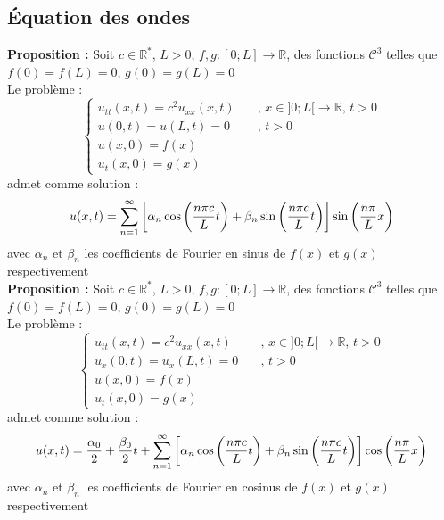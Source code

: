 \subsection{Équation des ondes}
\textbf{Proposition :} Soit $c \in \mathbb{R}^*$, $L > 0$, $f,g : [0;L] \to \mathbb{R}$, des fonctions $\mathcal{C}^3$ telles que $f(0) = f(L) = 0$, $g(0) = g(L) = 0$\\
Le problème :
$$
\begin{cases}
    u_{tt}(x,t) = c^2u_{xx}(x,t) \quad &\text{, } x \in ]0;L[ \to \mathbb{R} \text{, } t > 0 \\
    u(0,t) = u(L,t) = 0 \quad &\text{, } t > 0 \\
    u(x,0) = f(x) \\
    u_t(x,0) = g(x)
\end{cases}
$$
admet comme solution :
$$u(x,t) = \sum_{n=1}^{\infty} \bigg{[} \alpha_n \cos \bigg{(} \frac{n\pi c}{L}t \bigg{)} + \beta_n \sin \bigg{(} \frac{n\pi c}{L}t \bigg{)} \bigg{]} \sin \bigg{(} \frac{n\pi}{L}x \bigg{)}$$
avec $\alpha_n$ et $\beta_n$ les coefficients de Fourier en sinus de $f(x)$ et $g(x)$ respectivement \\
\textbf{Proposition :} Soit $c \in \mathbb{R}^*$, $L > 0$, $f,g : [0;L] \to \mathbb{R}$, des fonctions $\mathcal{C}^3$ telles que $f(0) = f(L) = 0$, $g(0) = g(L) = 0$\\
Le problème :
$$
\begin{cases}
    u_{tt}(x,t) = c^2u_{xx}(x,t) \quad &\text{, } x \in ]0;L[ \to \mathbb{R} \text{, } t > 0 \\
    u_x(0,t) = u_x(L,t) = 0 \quad &\text{, } t > 0 \\
    u(x,0) = f(x) \\
    u_t(x,0) = g(x)
\end{cases}
$$
admet comme solution :
$$u(x,t) = \frac{\alpha_0}{2} + \frac{\beta_0}{2}t + \sum_{n=1}^{\infty} \bigg{[} \alpha_n \cos \bigg{(} \frac{n\pi c}{L}t \bigg{)} + \beta_n \sin \bigg{(} \frac{n\pi c}{L}t \bigg{)} \bigg{]} \cos \bigg{(} \frac{n\pi}{L}x \bigg{)}$$
avec $\alpha_n$ et $\beta_n$ les coefficients de Fourier en cosinus de $f(x)$ et $g(x)$ respectivement